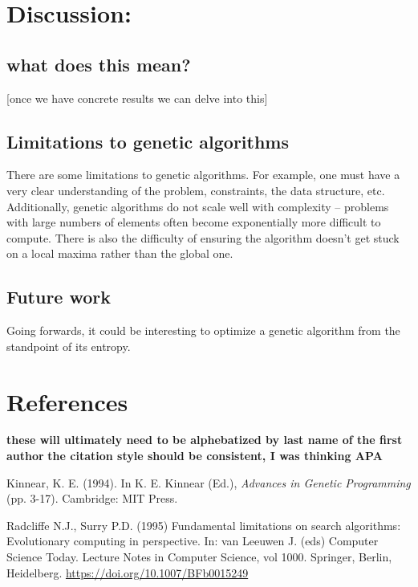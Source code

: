 \documentclass[11pt]{article}
\begin{document}
\section{Discussion:}
\label{sec:org7999995}
\subsection{what does this mean?}
\label{sec:orgf7b36ed}
[once we have concrete results we can delve into this]

\subsection{Limitations to genetic algorithms}
\label{sec:org148bf83}
There are some limitations to genetic algorithms. For example, one must have a very clear understanding of the problem,
constraints, the data structure, etc. Additionally, genetic algorithms do not scale well with complexity -- problems with
large numbers of elements often become exponentially more difficult to compute. There is also the difficulty of ensuring
the algorithm doesn't get stuck on a local maxima rather than the global one.

\subsection{Future work}
\label{sec:org0f04af1}
Going forwards, it could be interesting to optimize a genetic algorithm from the standpoint of its entropy.

\section{References}
\label{sec:org9dc046e}
\textbf{these will ultimately need to be alphebatized by last name of the first author}
\textbf{the citation style should be consistent, I was thinking APA}

Kinnear, K. E. (1994). In K. E. Kinnear (Ed.), \emph{Advances in Genetic Programming} (pp. 3-17). Cambridge: MIT Press.

Radcliffe N.J., Surry P.D. (1995) Fundamental limitations on search algorithms: Evolutionary computing in perspective.
In: van Leeuwen J. (eds) Computer Science Today. Lecture Notes in Computer Science, vol 1000. Springer, Berlin, Heidelberg.
\url{https://doi.org/10.1007/BFb0015249}
\end{document}
